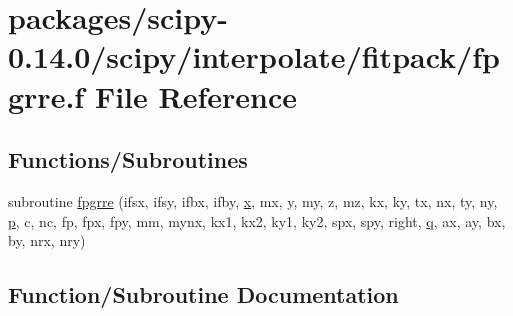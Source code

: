 \hypertarget{fpgrre_8f}{}\section{packages/scipy-\/0.14.0/scipy/interpolate/fitpack/fpgrre.f File Reference}
\label{fpgrre_8f}
\subsection*{Functions/\+Subroutines}
\begin{DoxyCompactItemize}
\item 
subroutine \hyperlink{fpgrre_8f_a4df39a9e0aa15e02e88b0d3fadf8f61c}{fpgrre} (ifsx, ifsy, ifbx, ifby, \hyperlink{vecnorm1_8cc_ac73eed9e41ec09d58f112f06c2d6cb63}{x}, mx, y, my, z, mz, kx, ky, tx, nx, ty, ny, \hyperlink{indexexpr_8h_a2b8c103eb5bfc196fbc3d29923e28ac1}{p}, c, nc, fp, fpx, fpy, mm, mynx, kx1, kx2, ky1, ky2, spx, spy, right, \hyperlink{indexexpr_8h_ac886c3584e464b5533390d7440c9dd98}{q}, ax, ay, bx, by, nrx, nry)
\end{DoxyCompactItemize}


\subsection{Function/\+Subroutine Documentation}
\hypertarget{fpgrre_8f_a4df39a9e0aa15e02e88b0d3fadf8f61c}{}
